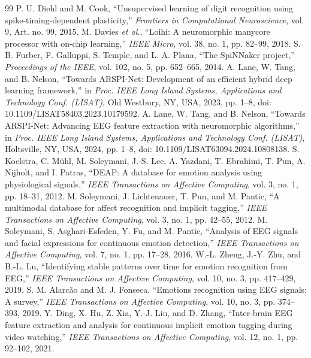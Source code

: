 \documentclass[journal]{IEEEtran}
\begin{document}
\begin{thebibliography}{99}
 P. U. Diehl and M. Cook, ``Unsupervised learning of digit recognition using spike-timing-dependent plasticity,'' \emph{Frontiers in Computational Neuroscience}, vol. 9, Art. no. 99, 2015.
 M. Davies \emph{et al.}, ``Loihi: A neuromorphic manycore processor with on-chip learning,'' \emph{IEEE Micro}, vol. 38, no. 1, pp. 82--99, 2018.
 S. B. Furber, F. Galluppi, S. Temple, and L. A. Plana, ``The SpiNNaker project,'' \emph{Proceedings of the IEEE}, vol. 102, no. 5, pp. 652--665, 2014.
 A. Lane, W. Tang, and B. Nelson, ``Towards ARSPI-Net: Development of an efficient hybrid deep learning framework,'' in \emph{Proc. IEEE Long Island Systems, Applications and Technology Conf. (LISAT)}, Old Westbury, NY, USA, 2023, pp. 1--8, doi: 10.1109/LISAT58403.2023.10179592.
 A. Lane, W. Tang, and B. Nelson, ``Towards ARSPI-Net: Advancing EEG feature extraction with neuromorphic algorithms,'' in \emph{Proc. IEEE Long Island Systems, Applications and Technology Conf. (LISAT)}, Holtsville, NY, USA, 2024, pp. 1--8, doi: 10.1109/LISAT63094.2024.10808138.
 S. Koelstra, C. M\"uhl, M. Soleymani, J.-S. Lee, A. Yazdani, T. Ebrahimi, T. Pun, A. Nijholt, and I. Patras, ``DEAP: A database for emotion analysis using physiological signals,'' \emph{IEEE Transactions on Affective Computing}, vol. 3, no. 1, pp. 18--31, 2012.
 M. Soleymani, J. Lichtenauer, T. Pun, and M. Pantic, ``A multimodal database for affect recognition and implicit tagging,'' \emph{IEEE Transactions on Affective Computing}, vol. 3, no. 1, pp. 42--55, 2012.
 M. Soleymani, S. Asghari-Esfeden, Y. Fu, and M. Pantic, ``Analysis of EEG signals and facial expressions for continuous emotion detection,'' \emph{IEEE Transactions on Affective Computing}, vol. 7, no. 1, pp. 17--28, 2016.
 W.-L. Zheng, J.-Y. Zhu, and B.-L. Lu, ``Identifying stable patterns over time for emotion recognition from EEG,'' \emph{IEEE Transactions on Affective Computing}, vol. 10, no. 3, pp. 417--429, 2019.
 S. M. Alarc\~{a}o and M. J. Fonseca, ``Emotions recognition using EEG signals: A survey,'' \emph{IEEE Transactions on Affective Computing}, vol. 10, no. 3, pp. 374--393, 2019.
 Y. Ding, X. Hu, Z. Xia, Y.-J. Liu, and D. Zhang, ``Inter-brain EEG feature extraction and analysis for continuous implicit emotion tagging during video watching,'' \emph{IEEE Transactions on Affective Computing}, vol. 12, no. 1, pp. 92--102, 2021.

\end{thebibliography}
\end{document}
